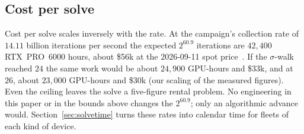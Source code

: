 \subsection{Cost per solve}
\label{sec:bounds-cost}

Cost per solve scales inversely with the rate. At the campaign's
collection rate of $14.11$ billion iterations per second the expected
$2^{60.9}$ iterations are $42{,}400$ RTX~PRO~6000 hours, about \$56k at the
2026-09-11 spot price~. If the $\sigma$-walk reached
$24$ the same work would be about $24{,}900$ GPU-hours and \$33k, and at
$26$, about $23{,}000$ GPU-hours and \$30k (our scaling of the measured
figures). Even the ceiling leaves the solve a five-figure rental
problem. No engineering in this paper or in the bounds above changes
the $2^{60.9}$; only an algorithmic advance would. Section~\ref{sec:solvetime} turns these rates
into calendar time for fleets of each kind of device.
